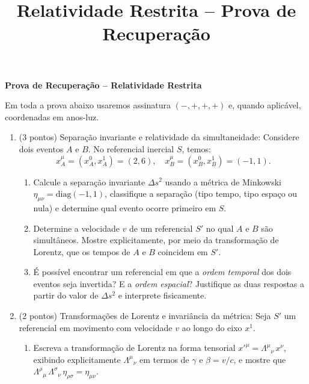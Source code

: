 \newif\ifuseseminar
\useseminartrue


\title{Relatividade Restrita -- Prova de Recuperação}


\begin{center}
    \textbf{\Large Prova de Recuperação -- Relatividade Restrita}
\end{center}

Em toda a prova abaixo usaremos assinatura $(-,+,+,+)$ e, quando aplicável,
coordenadas em anos-luz.

\begin{enumerate}

    \item (3 pontos) Separação invariante e relatividade da simultaneidade:
          Considere dois eventos $A$ e $B$. No referencial inercial $S$, temos:
          $$
              x_A^\mu = (x^0_A, x^1_A) = (2, 6), \quad
              x_B^\mu = (x^0_B, x^1_B) = (-1, 1).
          $$
          \begin{enumerate}
              \item Calcule a separação invariante $\Delta s^2$ usando a
                    métrica de Minkowski $\eta_{\mu\nu} = \mathrm{diag}(-1,1)$,
                    classifique a separação (tipo tempo, tipo espaço ou nula)
                    e determine qual evento ocorre primeiro em $S$.

              \item Determine a velocidade $v$ de um referencial $S'$ no qual
                    $A$ e $B$ são simultâneos. Mostre explicitamente, por meio
                    da transformação de Lorentz, que os tempos de $A$ e $B$
                    coincidem em $S'$.

              \item É possível encontrar um referencial em que a \emph{ordem
                          temporal} dos dois eventos seja invertida? E a \emph{ordem
                          espacial}? Justifique as duas respostas a partir do valor
                    de $\Delta s^2$ e interprete fisicamente.
          \end{enumerate}

    \item (2 pontos) Transformações de Lorentz e invariância da métrica: Seja
          $S'$ um referencial em movimento com velocidade $v$ ao longo do eixo
          $x^1$.
          \begin{enumerate}
              \item Escreva a transformação de Lorentz na forma tensorial
                    $x'^\mu = \Lambda^\mu{}_\nu\, x^\nu$, exibindo
                    explicitamente $\Lambda^\mu{}_\nu$ em termos de $\gamma$ e
                    $\beta = v/c$, e mostre que
                    $\Lambda^\rho{}_\mu\, \Lambda^\sigma{}_\nu\, \eta_{\rho\sigma}
                        = \eta_{\mu\nu}$.


\end{enumerate}
\end{enumerate}
